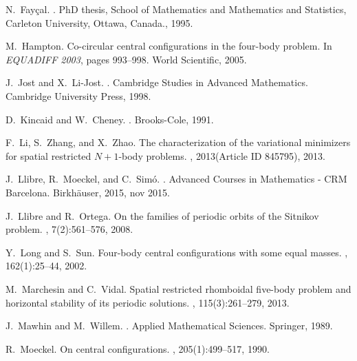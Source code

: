 \documentclass[smallcondensed]{svjour3}
\begin{document}
\begin{thebibliography}{10}
N.~Fay\c{c}al.
.
\newblock PhD thesis, School of Mathematics and Mathematics and Statistics,
  Carleton University, Ottawa, Canada., 1995.

M.~Hampton.
\newblock Co-circular central configurations in the four-body problem.
\newblock In {\em EQUADIFF 2003}, pages 993--998. World Scientific, 2005.

J.~Jost and X.~Li-Jost.
.
\newblock Cambridge Studies in Advanced Mathematics. Cambridge University
  Press, 1998.

D.~Kincaid and W.~Cheney.
.
\newblock Brooks-Cole, 1991.

F.~Li, S.~Zhang, and X.~Zhao.
\newblock The characterization of the variational minimizers for spatial
  restricted ${N}+1$-body problems.
, 2013(Article ID 845795), 2013.

J.~Llibre, R.~Moeckel, and C.~Sim\'o.
.
\newblock Advanced Courses in Mathematics - CRM Barcelona. Birkh{\"{a}}user,
  2015, nov 2015.

J.~Llibre and R.~Ortega.
\newblock On the families of periodic orbits of the {S}itnikov problem.
, 7(2):561--576, 2008.

Y.~Long and S.~Sun.
\newblock Four-body central configurations with some equal masses.
, 162(1):25--44,
  2002.

M.~Marchesin and C.~Vidal.
\newblock Spatial restricted rhomboidal five-body problem and horizontal
  stability of its periodic solutions.
, 115(3):261--279,
  2013.

J.~Mawhin and M.~Willem.
.
\newblock Applied Mathematical Sciences. Springer, 1989.

R.~Moeckel.
\newblock On central configurations.
, 205(1):499--517, 1990.


\end{thebibliography}
\end{document}
